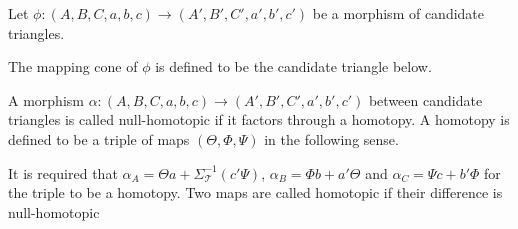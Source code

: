     \begin{definition}
        Let $\phi : (A,B,C,a,b,c) \rightarrow (A',B',C',a',b',c')$ be a morphism of candidate triangles.
        \begin{center}
        \end{center}
        The mapping cone of $\phi$ is defined to be the candidate triangle below.
        \begin{center}
        \end{center}
    \end{definition}

    \begin{definition}
        A morphism $\alpha : (A,B,C,a,b,c) \rightarrow (A',B',C',a',b',c')$ between candidate triangles is called null-homotopic if it factors through a homotopy. A homotopy is defined to be a triple of maps $(\Theta, \Phi, \Psi)$ in the following sense.
        \begin{center}
        \end{center}
        It is required that $\alpha_A  = \Theta a + \Sigma_{\mathcal{T}}^{-1}(c'\Psi)$, $\alpha_B = \Phi b + a'\Theta$ and $\alpha_C = \Psi c + b'\Phi$ for the triple to be a homotopy.
        Two maps are called homotopic if their difference is null-homotopic
    \end{definition}

